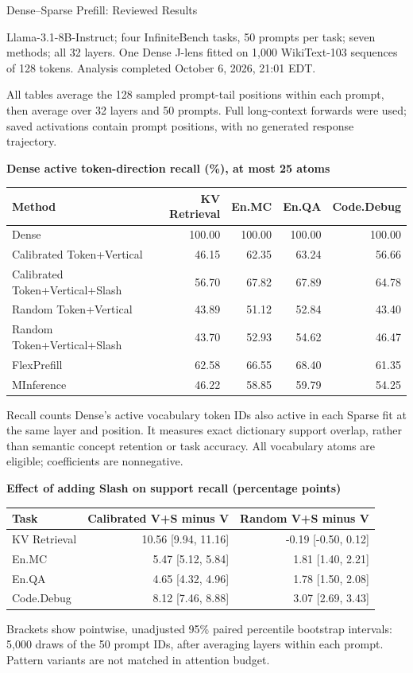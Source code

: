 \documentclass[10pt]{article}
\newcommand{\taskheader}{Method & KV Retrieval & En.MC & En.QA & Code.Debug\\}
\begin{document}
\begin{center}{\Large Dense--Sparse Prefill: Reviewed Results}\end{center}
Llama-3.1-8B-Instruct; four InfiniteBench tasks, 50 prompts per task; seven methods; all 32 layers. One Dense J-lens fitted on 1,000 WikiText-103 sequences of 128 tokens. Analysis completed October 6, 2026, 21:01 EDT.

All tables average the 128 sampled prompt-tail positions within each prompt, then average over 32 layers and 50 prompts. Full long-context forwards were used; saved activations contain prompt positions, with no generated response trajectory.

\textbf{Dense active token-direction recall (\%), at most 25 atoms}
\begin{center}\begin{tabular}{lrrrr}\toprule\taskheader\midrule
Dense & 100.00 & 100.00 & 100.00 & 100.00 \\
Calibrated Token+Vertical & 46.15 & 62.35 & 63.24 & 56.66 \\
Calibrated Token+Vertical+Slash & 56.70 & 67.82 & 67.89 & 64.78 \\
Random Token+Vertical & 43.89 & 51.12 & 52.84 & 43.40 \\
Random Token+Vertical+Slash & 43.70 & 52.93 & 54.62 & 46.47 \\
FlexPrefill & 62.58 & 66.55 & 68.40 & 61.35 \\
MInference & 46.22 & 58.85 & 59.79 & 54.25 \\
\bottomrule\end{tabular}\end{center}
Recall counts Dense's active vocabulary token IDs also active in each Sparse fit at the same layer and position. It measures exact dictionary support overlap, rather than semantic concept retention or task accuracy. All vocabulary atoms are eligible; coefficients are nonnegative.

\textbf{Effect of adding Slash on support recall (percentage points)}
\begin{center}\begin{tabular}{lrr}\toprule Task & Calibrated V+S minus V & Random V+S minus V\\\midrule
KV Retrieval & 10.56 [9.94, 11.16] & -0.19 [-0.50, 0.12] \\
En.MC & 5.47 [5.12, 5.84] & 1.81 [1.40, 2.21] \\
En.QA & 4.65 [4.32, 4.96] & 1.78 [1.50, 2.08] \\
Code.Debug & 8.12 [7.46, 8.88] & 3.07 [2.69, 3.43] \\
\bottomrule\end{tabular}\end{center}
Brackets show pointwise, unadjusted 95\% paired percentile bootstrap intervals: 5,000 draws of the 50 prompt IDs, after averaging layers within each prompt. Pattern variants are not matched in attention budget.
\end{document}
